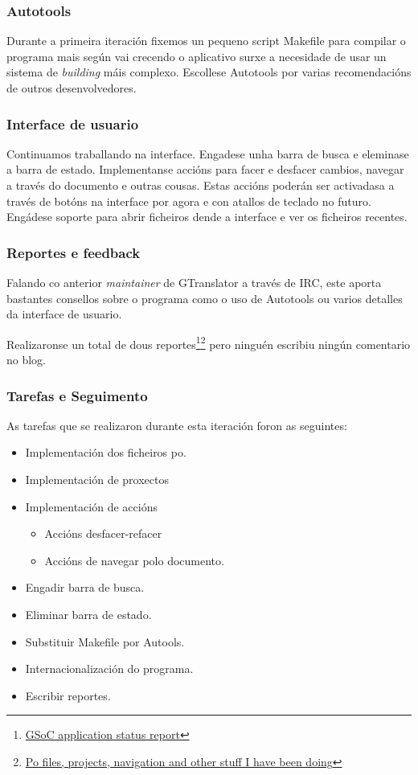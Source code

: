 \subsubsection{Autotools}
Durante a primeira iteración fixemos un pequeno script Makefile para compilar o programa mais según vai crecendo o aplicativo surxe a necesidade de usar un sistema de \emph{building} máis complexo. Escollese Autotools por varias recomendacións de outros desenvolvedores.

\subsubsection{Interface de usuario}
Continuamos traballando na interface. Engadese unha barra de busca e eleminase a barra de estado. Implementanse accións para facer e desfacer cambios, navegar a través do documento e outras cousas. Estas accións poderán ser activadasa a través de botóns na interface por agora e con atallos de teclado no futuro. Engádese soporte para abrir ficheiros dende a interface e ver os ficheiros recentes.

\subsubsection{Reportes e feedback}

Falando co anterior \emph{maintainer} de GTranslator a través de IRC, este aporta bastantes consellos sobre o programa como o uso de Autotools ou varios detalles da interface de usuario.

Realizaronse un total de dous reportes\footnote{\href{http://aquelando.info/gsoc-application-status-report/}{GSoC application status report}}\footnote{\href{http://aquelando.info/po-files-projects-navigation-and-other-stuff-i-have-been-doing/}{Po files, projects, navigation and other stuff I have been doing}} pero ninguén escribiu ningún comentario no blog.

\subsubsection{Tarefas e Seguimento}

As tarefas que se realizaron durante esta iteración foron as seguintes:

\begin {itemize}
  \item Implementación dos ficheiros po.
  \item Implementación de proxectos
  \item Implementación de accións
    \begin{itemize}
      \item Accións desfacer-refacer
      \item Accións de navegar polo documento.
    \end{itemize}
  \item Engadir barra de busca.
  \item Eliminar barra de estado.
  \item Substituir Makefile por Autools.
  \item Internacionalización do programa.
  \item Escribir reportes.
\end {itemize}

